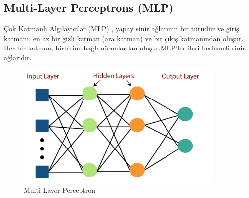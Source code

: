 \documentclass{article}
\begin{document}
\subsection{Multi-Layer Perceptrons (MLP)}
Çok Katmanlı Algılayıcılar (MLP) , yapay sinir ağlarının bir türüdür ve giriş katmanı, en az bir gizli katman (ara katman) ve bir çıkış katmanından oluşur. Her bir katman, birbirine bağlı nöronlardan oluşur.MLP’ler ileri beslemeli sinir ağlarıdır.\\[4pt]
\begin{figure}[htbp]
    \centering
    \includegraphics[width=0.9\textwidth]{image/Resim39.png}
    \caption{Multi-Layer Perceptron\cite{HiddenLayer}}
    \label{fig:python37}
    \vspace{0.2cm} %
\end{figure}
\end{document}
